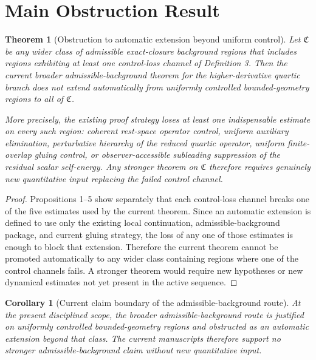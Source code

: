 \documentclass[11pt]{article}
\newtheorem{corollary}{Corollary}
\newtheorem{theorem}{Theorem}
\begin{document}
\section{Main Obstruction Result}

\begin{theorem}[Obstruction to automatic extension beyond uniform control]
Let \(\mathfrak C\) be any wider class of admissible exact-closure background regions that includes regions exhibiting at least one control-loss channel of Definition 3. Then the current broader admissible-background theorem for the higher-derivative quartic branch does not extend automatically from uniformly controlled bounded-geometry regions to all of \(\mathfrak C\).

More precisely, the existing proof strategy loses at least one indispensable estimate on every such region: coherent rest-space operator control, uniform auxiliary elimination, perturbative hierarchy of the reduced quartic operator, uniform finite-overlap gluing control, or observer-accessible subleading suppression of the residual scalar self-energy. Any stronger theorem on \(\mathfrak C\) therefore requires genuinely new quantitative input replacing the failed control channel.
\end{theorem}

\begin{proof}
Propositions 1--5 show separately that each control-loss channel breaks one of the five estimates used by the current theorem. Since an automatic extension is defined to use only the existing local continuation, admissible-background package, and current gluing strategy, the loss of any one of those estimates is enough to block that extension. Therefore the current theorem cannot be promoted automatically to any wider class containing regions where one of the control channels fails. A stronger theorem would require new hypotheses or new dynamical estimates not yet present in the active sequence.
\end{proof}

\begin{corollary}[Current claim boundary of the admissible-background route]
At the present disciplined scope, the broader admissible-background route is justified on uniformly controlled bounded-geometry regions and obstructed as an automatic extension beyond that class. The current manuscripts therefore support no stronger admissible-background claim without new quantitative input.
\end{corollary}
\end{document}
